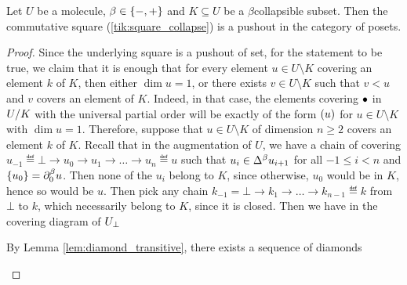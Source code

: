 \begin{lem} \label{lem:collapsible_is_puhsout}
    Let \( U \) be a molecule, \( \beta \in \set{-, +} \) and \( K \subseteq U \) be a \( \beta \)\nbd collapsible subset.
    Then the commutative square (\ref{tik:square_collapse}) is a pushout in the category of posets.
\end{lem}
\begin{proof}
    Since the underlying square is a pushout of set, for the statement to be true, we claim that it is enough that for every element \( u \in U \setminus K \) covering an element \( k \) of \( K \), then either \( \dim u = 1 \), or there exists \( v \in U \setminus K \) such that \( v < u \) and \( v \) covers an element of \( K \).
    Indeed, in that case, the elements covering \( \zcoll \) in \( \coll{K}{U} \) with the universal partial order will be exactly of the form \( \icoll{u} \) for \( u \in U \setminus K \) with \( \dim u = 1 \). 
    Therefore, suppose that \( u \in U \setminus K \) of dimension \( n \geq 2 \) covers an element \( k \) of \( K \).
    Recall that in the augmentation of \( U \), we have a chain of covering \( u_{-1} \eqdef \bot \to u_0 \to u_1 \to \ldots \to u_n \eqdef u \) such that \( u_i \in \faces{}{\beta} u_{i + 1} \) for all \( - 1 \le i < n \) and \( \set{u_0} = \bd{0}{\beta} u \).
    Then none of the \( u_i \) belong to \( K \), since otherwise, \( u_0 \) would be in \( K \), hence so would be \( u \).
    Then pick any chain \( k_{- 1} = \bot \to k_1 \to \ldots \to k_{n - 1} \eqdef k \) from \( \bot \) to \( k \), which necessarily belong to \( K \), since it is closed.
    Then we have in the covering diagram of \( \augm{U} \) 
    \begin{center}
    \end{center}
    By Lemma \ref{lem:diamond_transitive}, there exists a sequence of diamonds
    \begin{center}
        \begin{tikzcd}

\end{tikzcd}
\end{center}
\end{proof}
